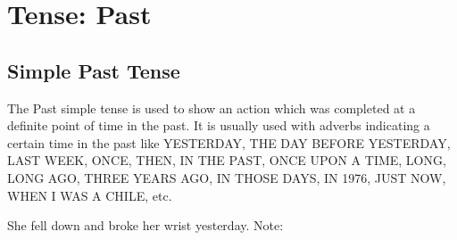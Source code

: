 \section{Tense: Past}
\subsection{Simple Past Tense}
The Past simple tense is used to show an action which was completed at a
definite point of time in the past.
It is usually used with adverbs indicating a certain time in the past like
YESTERDAY, THE DAY BEFORE YESTERDAY, LAST WEEK, ONCE, THEN, IN THE PAST, ONCE
UPON A TIME, LONG, LONG AGO, THREE YEARS AGO, IN THOSE DAYS, IN 1976, JUST NOW,
WHEN I WAS A CHILE, etc.

She fell down and broke her wrist yesterday.
\newline
Note:
